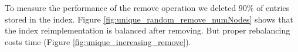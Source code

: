 \documentclass[11pt,a4paper,oneside]{article}
\begin{document}
To measure the performance of the remove operation we deleted $90\%$ of entries stored in the index.
Figure \ref{fig:unique_random_remove_numNodes} shows that the index reimplementation is balanced after removing. 
But proper rebalancing costs time (Figure \ref{fig:unique_increasing_remove}).

\begin{figure}
    \centering
\end{figure}
\end{document}
